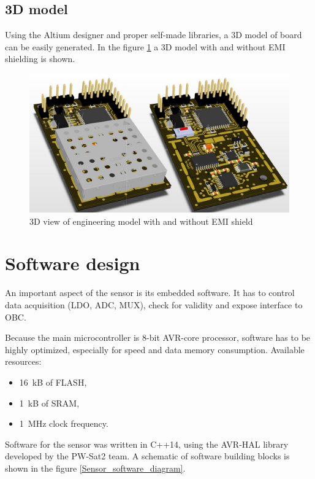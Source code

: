     \subsection{3D model}
        Using the Altium designer and proper self-made libraries, a 3D model of board can be easily generated. In the figure \ref{pcb_3d_model} a 3D model with and without EMI shielding is shown.

        \begin{figure}[H]
            \centering
            \includegraphics[width=0.8\paperwidth]{img/06/pcb_3d_model.png}
            \caption{3D view of engineering model with and without EMI shield}
            \label{pcb_3d_model}
        \end{figure}

\section{Software design}
    An important aspect of the sensor is its embedded software. It has to control data acquisition (LDO, ADC, MUX), check for validity and expose \iic interface to OBC.

    Because the main microcontroller is 8-bit AVR-core processor, software has to be highly optimized, especially for speed and data memory consumption. Available resources:
    \begin{itemize}
        \item \SI{16}{\kilo B} of FLASH,
        \item \SI{1}{\kilo B} of SRAM,
        \item \SI{1}{\mega\hertz} clock frequency.
    \end{itemize}

    Software for the sensor was written in C++14, using the AVR-HAL library developed by the PW-Sat2 team. A schematic of software building blocks is shown in the figure \ref{Sensor_software_diagram}.

